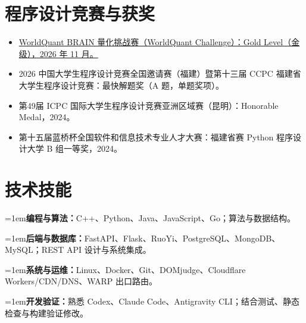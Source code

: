 \documentclass[10pt,a4paper]{article}
\newcommand{\skillrow}[2]{%
  \par\noindent\hangindent=1em\hangafter=1\textbf{#1：}#2\par
}
\begin{document}
\section{程序设计竞赛与获奖}
\begin{itemize}
  \item \href{https://au1bhi.com/files/WorldQuant-Challenge-Gold-Certificate.pdf}{WorldQuant BRAIN 量化挑战赛（WorldQuant Challenge）：Gold Level（金级），2026 年 11 月。}
  \item 2026 中国大学生程序设计竞赛全国邀请赛（福建）暨第十三届 CCPC 福建省大学生程序设计竞赛：最快解题奖（A 题，单题奖项）。
  \item 第49届 ICPC 国际大学生程序设计竞赛亚洲区域赛（昆明）：Honorable Medal，2024。
  \item 第十五届蓝桥杯全国软件和信息技术专业人才大赛：福建省赛 Python 程序设计大学 B 组一等奖，2024。
\end{itemize}
\section{技术技能}
\skillrow{编程与算法}{C++、Python、Java、JavaScript、Go；算法与数据结构。}
\skillrow{后端与数据库}{FastAPI、Flask、RuoYi、PostgreSQL、MongoDB、MySQL；REST API 设计与系统集成。}
\skillrow{系统与运维}{Linux、Docker、Git、DOMjudge、Cloudflare Workers/CDN/DNS、WARP 出口路由。}
\skillrow{开发验证}{熟悉 Codex、Claude Code、Antigravity CLI；结合测试、静态检查与构建验证修改。}
\end{document}
